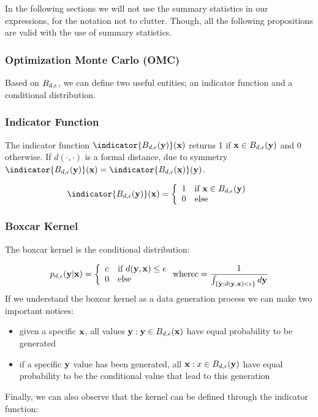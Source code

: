 \noindent
In the following sections we will not use the summary statistics in
our expressions, for the notation not to clutter. Though, all the
following propositions are valid with the use of summary statistics.
  
\subsubsection{Optimization Monte Carlo (OMC)}

Based on $B_{d,\epsilon}$, we can define two useful entities; an indicator
function and a conditional distribution.

\subsubsection*{Indicator Function}

The indicator function $\indicator{\region(\yb)}(\xb)$ returns 1 if
$\mathbf{x} \in B_{d,\epsilon}(\mathbf{y})$ and 0 otherwise. If $d(\cdot,\cdot)$ is a
formal distance, due to symmetry
$\indicator{\region(\yb)}(\xb) = \indicator{\region(\xb)}(\yb)$.

\begin{gather} \label{eq:indicator} \indicator{\region(\yb)}(\xb)=
  \left\{
    \begin{array}{ll}
      1 & \mbox{if } \xb \in \region(\yb) \\
      0 & \mbox{else } 
    \end{array} \right. \end{gather}

\subsubsection*{Boxcar Kernel}

The boxcar kernel is the conditional distribution:

\begin{gather}
  p_{d,\epsilon}(\mathbf{y}|\mathbf{x}) = \left\{
    \begin{array}{ll}
      c  & \mbox{if } d(\mathbf{y},\mathbf{x}) \leq \epsilon \\
      0 & \mbox{else } 
    \end{array}
  \right. \text{where} c = \frac{1}{\int_{ \{ \mathbf{y}: d(\mathbf{y},\mathbf{x}) <
      \epsilon \} } d\mathbf{y}}
\end{gather}
%
If we understand the boxcar kernel as a data generation process we can
make two important notices:

\begin{itemize}
\item given a specific $\mathbf{x}$, all values
  $\mathbf{y}: \mathbf{y} \in B_{d,\epsilon}(\mathbf{x})$ have equal probability to be
  generated
\item if a specific $\mathbf{y}$ value has been generated, all
  $\mathbf{x}: x \in B_{d,\epsilon}(\mathbf{y})$ have equal probability to be the
  conditional value that lead to this generation
\end{itemize}
%
Finally, we can also observe that the kernel can be defined through
the indicator function:

